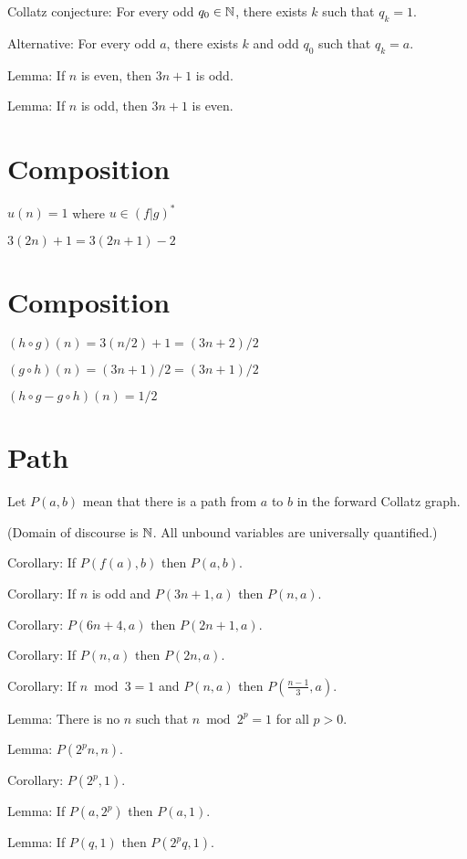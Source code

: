 Collatz conjecture: For every odd \(q_0 \in \mathbb{N}\), there exists \(k\) such that \(q_k = 1\).

Alternative: For every odd \(a\), there exists \(k\) and odd \(q_0\) such that \(q_k = a\).

Lemma: If \(n\) is even, then \(3n+1\) is odd.

Lemma: If \(n\) is odd, then \(3n+1\) is even.

\section{Composition}

\(u(n) = 1\) where \(u \in (f|g)^*\)

\(3(2n)+1 = 3(2n+1)-2\)

\section{Composition}

\((h \circ g)(n) = 3(n/2) + 1 = (3n+2)/2\)

\((g \circ h)(n) = (3n + 1)/2 = (3n+1)/2\)

\((h \circ g - g \circ h)(n) = 1/2\)

\section{Path}

Let \(P(a,b)\) mean that there is a path from \(a\) to \(b\) in the forward Collatz graph.

(Domain of discourse is \(\mathbb{N}\).
All unbound variables are universally quantified.)

Corollary: If \(P(f(a),b)\) then \(P(a,b)\).

Corollary: If \(n\) is odd and \(P(3n+1,a)\) then \(P(n,a)\).

Corollary: \(P(6n+4,a)\) then \(P(2n+1,a)\).

Corollary: If \(P(n,a)\) then \(P(2n,a)\).

Corollary: If \(n \bmod 3 = 1\) and \(P(n,a)\) then \(P(\frac{n-1}{3},a)\).

Lemma: There is no \(n\) such that \(n \bmod 2^p = 1\) for all \(p > 0\).

Lemma: \(P(2^p n, n)\).

Corollary: \(P(2^p,1)\).

Lemma: If \(P(a,2^p)\) then \(P(a,1)\).

Lemma: If \(P(q, 1)\) then \(P(2^p q,1)\).

